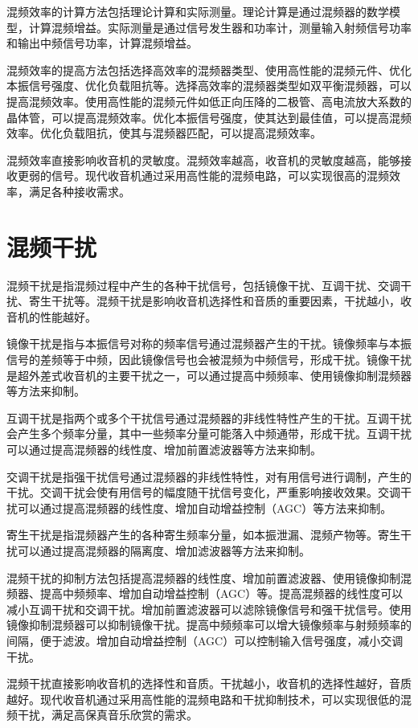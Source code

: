 \documentclass[12pt,UTF8]{ctexbook}
\begin{document}
混频效率的计算方法包括理论计算和实际测量。理论计算是通过混频器的数学模型，计算混频增益。实际测量是通过信号发生器和功率计，测量输入射频信号功率和输出中频信号功率，计算混频增益。

混频效率的提高方法包括选择高效率的混频器类型、使用高性能的混频元件、优化本振信号强度、优化负载阻抗等。选择高效率的混频器类型如双平衡混频器，可以提高混频效率。使用高性能的混频元件如低正向压降的二极管、高电流放大系数的晶体管，可以提高混频效率。优化本振信号强度，使其达到最佳值，可以提高混频效率。优化负载阻抗，使其与混频器匹配，可以提高混频效率。

混频效率直接影响收音机的灵敏度。混频效率越高，收音机的灵敏度越高，能够接收更弱的信号。现代收音机通过采用高性能的混频电路，可以实现很高的混频效率，满足各种接收需求。

\section{混频干扰}

混频干扰是指混频过程中产生的各种干扰信号，包括镜像干扰、互调干扰、交调干扰、寄生干扰等。混频干扰是影响收音机选择性和音质的重要因素，干扰越小，收音机的性能越好。

镜像干扰是指与本振信号对称的频率信号通过混频器产生的干扰。镜像频率与本振信号的差频等于中频，因此镜像信号也会被混频为中频信号，形成干扰。镜像干扰是超外差式收音机的主要干扰之一，可以通过提高中频频率、使用镜像抑制混频器等方法来抑制。

互调干扰是指两个或多个干扰信号通过混频器的非线性特性产生的干扰。互调干扰会产生多个频率分量，其中一些频率分量可能落入中频通带，形成干扰。互调干扰可以通过提高混频器的线性度、增加前置滤波器等方法来抑制。

交调干扰是指强干扰信号通过混频器的非线性特性，对有用信号进行调制，产生的干扰。交调干扰会使有用信号的幅度随干扰信号变化，严重影响接收效果。交调干扰可以通过提高混频器的线性度、增加自动增益控制（AGC）等方法来抑制。

寄生干扰是指混频器产生的各种寄生频率分量，如本振泄漏、混频产物等。寄生干扰可以通过提高混频器的隔离度、增加滤波器等方法来抑制。

混频干扰的抑制方法包括提高混频器的线性度、增加前置滤波器、使用镜像抑制混频器、提高中频频率、增加自动增益控制（AGC）等。提高混频器的线性度可以减小互调干扰和交调干扰。增加前置滤波器可以滤除镜像信号和强干扰信号。使用镜像抑制混频器可以抑制镜像干扰。提高中频频率可以增大镜像频率与射频频率的间隔，便于滤波。增加自动增益控制（AGC）可以控制输入信号强度，减小交调干扰。

混频干扰直接影响收音机的选择性和音质。干扰越小，收音机的选择性越好，音质越好。现代收音机通过采用高性能的混频电路和干扰抑制技术，可以实现很低的混频干扰，满足高保真音乐欣赏的需求。
\end{document}
